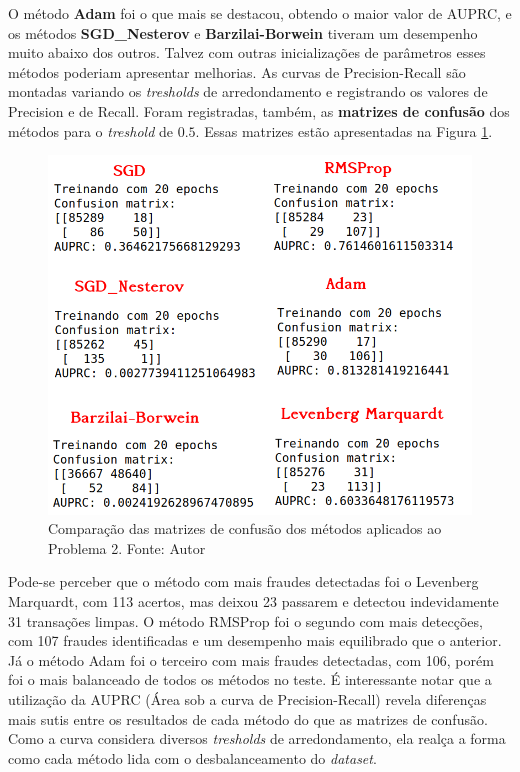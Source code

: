 \documentclass[11pt]{article}
\begin{document}
\noindent
O método \textbf{Adam} foi o que mais se destacou, obtendo o maior valor de AUPRC, e os métodos \textbf{SGD\_Nesterov} e \textbf{Barzilai-Borwein} tiveram um desempenho muito abaixo dos outros. Talvez com outras inicializações de parâmetros esses métodos poderiam apresentar melhorias.
As curvas de Precision-Recall são montadas variando os \textit{tresholds} de arredondamento e registrando os valores de Precision e de Recall. Foram registradas, também, as \textbf{matrizes de confusão} dos métodos para o \textit{treshold} de $0.5$. Essas matrizes estão apresentadas na Figura \ref{CONFM}.


\begin{figure}[H]
\center
\includegraphics[scale=0.5]{Figuras/CONFMAT.png}
\caption{Comparação das matrizes de confusão dos métodos aplicados ao Problema 2. Fonte: Autor} 
\label{CONFM}
\end{figure}


\noindent
Pode-se perceber que o método com mais fraudes detectadas foi o Levenberg Marquardt, com 113 acertos, mas deixou 23 passarem e detectou indevidamente 31 transações limpas. O método RMSProp foi o segundo com mais detecções, com 107 fraudes identificadas e um desempenho mais equilibrado que o anterior. Já o método Adam foi o terceiro com mais fraudes detectadas, com 106, porém foi o mais balanceado de todos os métodos no teste. É interessante notar que a utilização da AUPRC (Área sob a curva de Precision-Recall) revela diferenças mais sutis entre os resultados de cada método do que as matrizes de confusão. Como a curva considera diversos \textit{tresholds} de arredondamento, ela realça a forma como cada método lida com o desbalanceamento do \textit{dataset}.
\end{document}

